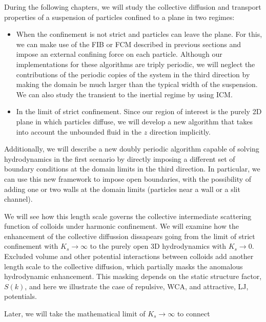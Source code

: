 \documentclass[ twoside,openright,titlepage,numbers=noenddot,%
headinclude,footinclude,cleardoublepage=empty,abstract=on,
BCOR=5mm,paper=a4,fontsize=11pt, dvipsnames
]{scrreprt}
\begin{document}
During the following chapters, we will study the collective diffusion and transport properties of a suspension of particles confined to a plane in two regimes:
\begin{itemize}
\item When the confinement is not strict and particles can leave the plane. For this, we can make use of the \gls{FIB} or \gls{FCM} described in previous sections and impose an external confining force on each particle. Although our implementations for these algorithms are triply periodic, we will neglect the contributions of the periodic copies of the system in the third direction by making the domain be much larger than the typical width of the suspension. We can also study the transient to the inertial regime by using \gls{ICM}.
\item In the limit of strict confinement. Since our region of interest is the purely 2D plane in which particles diffuse, we will develop a new algorithm that takes into account the unbounded fluid in the $z$ direction implicitly.
\end{itemize}
Additionally, we will describe a new doubly periodic algorithm capable of solving hydrodynamics in the first scenario by directly imposing a different set of boundary conditions at the domain limits in the third direction. In particular, we can use this new framework to impose open boundaries, with the possibility of adding one or two walls at the domain limits (particles near a wall or a slit channel).


We will see how this length scale governs the collective intermediate scattering function of colloids under harmonic confinement. We will examine how the enhancement of the collective diffussion dissapears going from the limit of strict confinement with $K_s\rightarrow \infty$ to the purely open 3D hydrodynamics with $K_s\rightarrow 0$.
Excluded volume and other potential interactions between colloids add another length scale to the collective diffusion, which partially masks the anomalous hydrodynamic enhancement. This masking depends on the static structure factor, $S(k)$, and here we illustrate the case of repulsive, \gls{WCA}, and attractive, \gls{LJ}, potentials.

Later, we will take the mathematical limit of $K_s\rightarrow \infty$ to connect 
\end{document}
